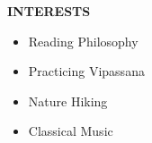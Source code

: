 \documentclass[10pt,letterpaper]{article}
\begin{document}
\begin{minipage}[t]{0.32\textwidth}
  \vspace{0.3cm}
  
  \begin{tcolorbox}[
    colback=accent,
    colframe=primary,
    boxrule=0pt,
    leftrule=3pt,
    arc=0pt,
    left=6pt,
    right=6pt,
    top=6pt,
    bottom=6pt
  ]
    {\color{primary}\fontsize{10}{12}\selectfont\sffamily\bfseries INTERESTS} \\[0.4em]
    \fontsize{8.5}{11}\selectfont\color{charcoal}
    \begin{itemize}[leftmargin=*, nosep]
      \item Reading Philosophy
      \item Practicing Vipassana
      \item Nature Hiking
      \item Classical Music
    \end{itemize}
  \end{tcolorbox}
\end{minipage}%
\hfill
\end{document}
